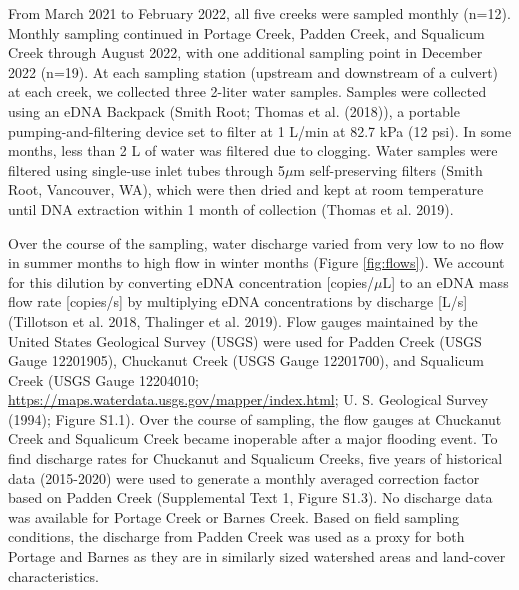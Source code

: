\documentclass[
]{article}
\begin{document}
From March 2021 to February 2022, all five creeks were sampled monthly
(n=12). Monthly sampling continued in Portage Creek, Padden Creek, and
Squalicum Creek through August 2022, with one additional sampling point
in December 2022 (n=19). At each sampling station (upstream and
downstream of a culvert) at each creek, we collected three 2-liter water
samples. Samples were collected using an eDNA Backpack (Smith Root;
Thomas et al. (2018)), a portable pumping-and-filtering device set to
filter at 1 L/min at 82.7 kPa (12 psi). In some months, less than 2 L of
water was filtered due to clogging. Water samples were filtered using
single-use inlet tubes through 5\(\mu\)m self-preserving filters (Smith
Root, Vancouver, WA), which were then dried and kept at room temperature
until DNA extraction within 1 month of collection (Thomas et al. 2019).

Over the course of the sampling, water discharge varied from very low to
no flow in summer months to high flow in winter months (Figure
\ref{fig:flows}). We account for this dilution by converting eDNA
concentration {[}copies/\(\mu\)L{]} to an eDNA mass flow rate
{[}copies/s{]} by multiplying eDNA concentrations by discharge {[}L/s{]}
(Tillotson et al. 2018, Thalinger et al. 2019). Flow gauges maintained
by the United States Geological Survey (USGS) were used for Padden Creek
(USGS Gauge 12201905), Chuckanut Creek (USGS Gauge 12201700), and
Squalicum Creek (USGS Gauge 12204010;
\url{https://maps.waterdata.usgs.gov/mapper/index.html}; U. S.
Geological Survey (1994); Figure S1.1). Over the course of sampling, the
flow gauges at Chuckanut Creek and Squalicum Creek became inoperable
after a major flooding event. To find discharge rates for Chuckanut and
Squalicum Creeks, five years of historical data (2015-2020) were used to
generate a monthly averaged correction factor based on Padden Creek
(Supplemental Text 1, Figure S1.3). No discharge data was available for
Portage Creek or Barnes Creek. Based on field sampling conditions, the
discharge from Padden Creek was used as a proxy for both Portage and
Barnes as they are in similarly sized watershed areas and land-cover
characteristics.
\end{document}
